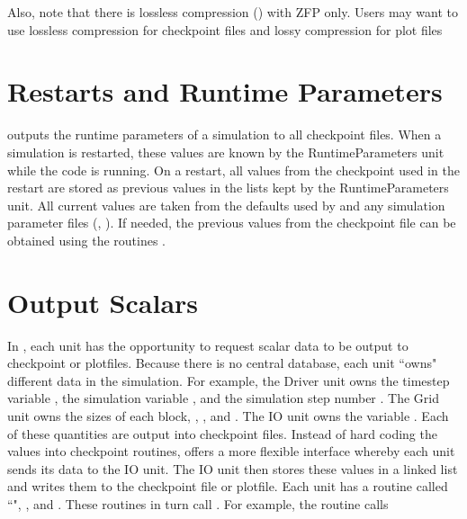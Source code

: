 

Also, note that there is lossless compression () with ZFP only. 
Users may want to use lossless compression for checkpoint files and lossy compression for plot files


\section{Restarts and Runtime Parameters}\label{Sec:runtime parameters}

\flashx outputs the runtime parameters of a simulation to all checkpoint files.
When a simulation is restarted, these values are known by the \unit{RuntimeParameters} unit while
the code is running.  On a restart, all values from the checkpoint used in the
restart are stored as previous values in the lists kept by the
\unit{RuntimeParameters} unit.  All current values are taken from the
defaults used by \flashx and any simulation parameter files (\eg, ).  If needed, the previous
values from the checkpoint file can be obtained using the routines 
.

\section{Output Scalars}\label{Sec:output scalars}

In \flashx, each unit has the opportunity to request scalar data to be
output to checkpoint or plotfiles.  Because there is no central
database, each unit ``owns" different data in the
simulation. For example, the \unit{Driver} unit owns the timestep variable
, the simulation variable , and the simulation
step number .  The \unit{Grid} unit owns the sizes of each
block, , , and .  The \unit{IO} unit owns
the variable .  Each of these
quantities are output into checkpoint files. Instead of hard coding the values into
checkpoint routines, \flashx offers a more flexible interface whereby
each unit sends its data to the \unit{IO} unit.  The \unit{IO} unit then stores
these values in a linked list and writes them to the checkpoint file or
plotfile.  Each unit has a routine called ``", \eg,
 and
. These routines in turn call
.  For example, the routine
 calls

